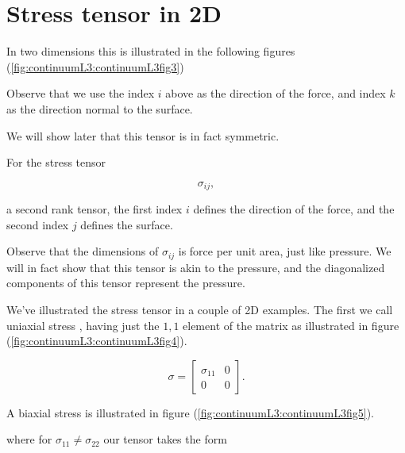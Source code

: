 \label{chap:continuumL4}
\section{Stress tensor in 2D}

In two dimensions this is illustrated in the following figures (\ref{fig:continuumL3:continuumL3fig3})

Observe that we use the index $i$ above as the direction of the force, and index $k$ as the direction normal to the surface.

We will show later that this tensor is in fact symmetric.

For the stress tensor

\begin{equation}\label{eqn:continuumL4:10}
\sigma_{ij},
\end{equation}

a second rank tensor, the first index $i$ defines the direction of the force, and the second index $j$ defines the surface.

Observe that the dimensions of $\sigma_{ij}$ is force per unit area, just like pressure.  We will in fact show that this tensor is akin to the pressure, and the diagonalized components of this tensor represent the pressure.

We've illustrated the stress tensor in a couple of 2D examples.  The first we call uniaxial stress , having just the $1,1$ element of the matrix as illustrated in figure (\ref{fig:continuumL3:continuumL3fig4}).

\begin{equation}\label{eqn:continuumL4:30}
\sigma = 
\begin{bmatrix}
\sigma_{11} & 0 \\
0 & 0
\end{bmatrix}.
\end{equation}

A biaxial stress  is illustrated in figure (\ref{fig:continuumL3:continuumL3fig5}).

where for $\sigma_{11} \ne \sigma_{22}$ our tensor takes the form


